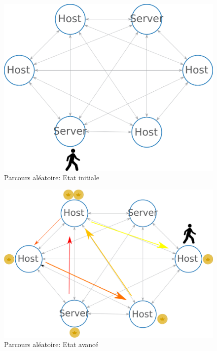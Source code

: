 \documentclass[10pt,a4paper,oneside]{article}
\begin{document}
\begin{figure}[!h]
\centering
\includegraphics[scale=0.5]{./images/PNG/GraphesRandomWalk.png}
\caption{Parcours aléatoire: Etat initiale}
\label{graphrwb}
\end{figure}

\begin{figure}[!h]
\centering
\includegraphics[scale=0.5]{./images/PNG/GraphesRandomWalk2.png}
\caption{Parcours aléatoire: Etat avancé}
\label{graphrw}
\end{figure}
\end{document}
